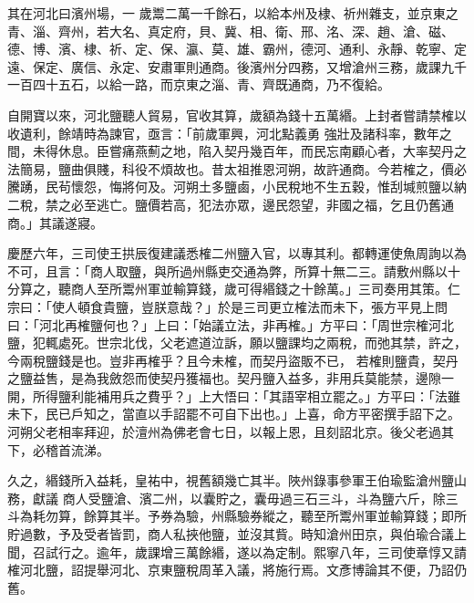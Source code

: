 \begin{pinyinscope}
 其在河北曰濱州場，一
 歲鬻二萬一千餘石，以給本州及棣、祈州雜支，並京東之青、淄、齊州，若大名、真定府，貝、冀、相、衛、邢、洺、深、趙、滄、磁、德、博、濱、棣、祈、定、保、瀛、莫、雄、霸州，德河、通利、永靜、乾寧、定遠、保定、廣信、永定、安肅軍則通商。後濱州分四務，又增滄州三務，歲課九千一百四十五石，以給一路，而京東之淄、青、齊既通商，乃不復給。



 自開寶以來，河北鹽聽人貿易，官收其算，歲額為錢十五萬緡。上封者嘗請禁榷以收遺利，餘靖時為諫官，亟言：「前歲軍興，河北點義勇
 強壯及諸科率，數年之間，未得休息。臣嘗痛燕薊之地，陷入契丹幾百年，而民忘南顧心者，大率契丹之法簡易，鹽曲俱賤，科役不煩故也。昔太祖推恩河朔，故許通商。今若榷之，價必騰踴，民茍懷怨，悔將何及。河朔土多鹽鹵，小民稅地不生五穀，惟刮堿煎鹽以納二稅，禁之必至逃亡。鹽價若高，犯法亦眾，邊民怨望，非國之福，乞且仍舊通商。」其議遂寢。



 慶歷六年，三司使王拱辰復建議悉榷二州鹽入官，以專其利。都轉運使魚周詢以為
 不可，且言：「商人取鹽，與所過州縣吏交通為弊，所算十無二三。請敷州縣以十分算之，聽商人至所鬻州軍並輸算錢，歲可得緡錢之十餘萬。」三司奏用其策。仁宗曰：「使人頓食貴鹽，豈朕意哉？」於是三司更立榷法而未下，張方平見上問曰：「河北再榷鹽何也？」上曰：「始議立法，非再榷。」方平曰：「周世宗榷河北鹽，犯輒處死。世宗北伐，父老遮道泣訴，願以鹽課均之兩稅，而弛其禁，許之，今兩稅鹽錢是也。豈非再榷乎？且今未榷，而契丹盜販不已，
 若榷則鹽貴，契丹之鹽益售，是為我斂怨而使契丹獲福也。契丹鹽入益多，非用兵莫能禁，邊隙一開，所得鹽利能補用兵之費乎？」上大悟曰：「其語宰相立罷之。」方平曰：「法雖未下，民已戶知之，當直以手詔罷不可自下出也。」上喜，命方平密撰手詔下之。河朔父老相率拜迎，於澶州為佛老會七日，以報上恩，且刻詔北京。後父老過其下，必稽首流涕。



 久之，緡錢所入益耗，皇祐中，視舊額幾亡其半。陜州錄事參軍王伯瑜監滄州鹽山務，獻議
 商人受鹽滄、濱二州，以囊貯之，囊毋過三石三斗，斗為鹽六斤，除三斗為耗勿算，餘算其半。予券為驗，州縣驗券縱之，聽至所鬻州軍並輸算錢；即所貯過數，予及受者皆罰，商人私挾他鹽，並沒其貲。時知滄州田京，與伯瑜合議上聞，召試行之。逾年，歲課增三萬餘緡，遂以為定制。熙寧八年，三司使章惇又請榷河北鹽，詔提舉河北、京東鹽稅周革入議，將施行焉。文彥博論其不便，乃詔仍舊。



\end{pinyinscope}
